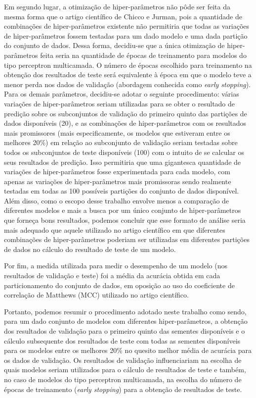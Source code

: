 Em segundo lugar, a otimização de hiper-parâmetros não pôde ser feita da mesma forma que o artigo científico de Chicco e Jurman, pois a quantidade de combinações de hiper-parâmetros existente não permitiria que todas as variações de hiper-parâmetros fossem testadas para um dado modelo e uma dada partição do conjunto de dados. Dessa forma, decidiu-se que a única otimização de hiper-parâmetros feita seria na quantidade de épocas de treinamento para modelos do tipo perceptron multicamada. O número de épocas escolhido para treinamento na obtenção dos resultados de teste será equivalente à época em que o modelo teve a menor perda nos dados de validação (abordagem conhecida como \textit{early stopping}). Para os demais parâmetros, decidiu-se adotar o seguinte procedimento: várias variações de hiper-parâmetros seriam utilizadas para se obter o resultado de predição sobre os subconjuntos de validação do primeiro quinto das partições de dados disponíveis (20), e as combinações de hiper-parâmetros com os resultados mais promissores (mais especificamente, os modelos que estiveram entre os melhores 20\%) em relação ao subconjunto de validação seriam testadas sobre todos os subconjuntos de teste disponíveis (100) com o intuito de se calcular os seus resultados de predição. Isso permitiria que uma gigantesca quantidade de variações de hiper-parâmetros fosse experimentada para cada modelo, com apenas as variações de hiper-parâmetros mais promissoras sendo realmente testadas em todas as 100 possíveis partições do conjunto de dados disponível. Além disso, como o escopo desse trabalho envolve menos a comparação de diferentes modelos e mais a busca por um único conjunto de hiper-parâmetros que forneça bons resultados, podemos concluir que esse formato de análise seria mais adequado que aquele utilizado no artigo científico em que diferentes combinações de hiper-parâmetros poderiam ser utilizadas em diferentes partições de dados no cálculo do resultado de teste de um modelo.

Por fim, a medida utilizada para medir o desempenho de um modelo (nos resultados de validação e teste) foi a média da acurácia obtida em cada particionamento do conjunto de dados, em oposição ao uso do coeficiente de correlação de Matthews (MCC) utilizado no artigo científico.

Portanto, podemos resumir o procedimento adotado neste trabalho como sendo, para um dado conjunto de modelos com diferentes hiper-parâmetros, a obtenção dos resultados de validação para o primeiro quinto das sementes disponíveis e o cálculo subsequente dos resultados de teste com todas as sementes disponíveis para os modelos entre os melhores 20\% no quesito melhor média de acurácia para os dados de validação. Os resultados de validação influenciariam na escolha de quais modelos seriam utilizados para o cálculo de resultados de teste e também, no caso de modelos do tipo perceptron multicamada, na escolha do número de épocas de treinamento (\textit{early stopping}) para a obtenção de resultados de teste.

